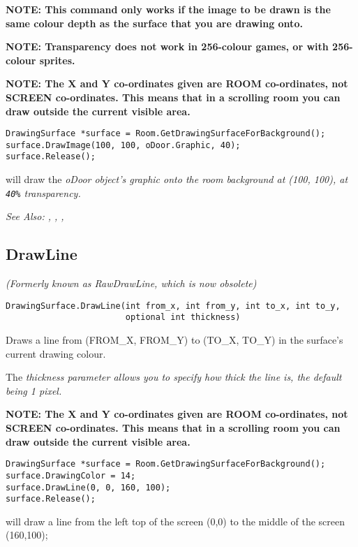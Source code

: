 \bf{NOTE:} This command only works if the image to be drawn is the same colour
depth as the surface that you are drawing onto.

\bf{NOTE:} Transparency does not work in 256-colour games, or with 256-colour sprites.

\bf{NOTE:} The X and Y co-ordinates given are ROOM co-ordinates, not SCREEN co-ordinates.
This means that in a scrolling room you can draw outside the current visible area.

\begin{verbatim}
DrawingSurface *surface = Room.GetDrawingSurfaceForBackground();
surface.DrawImage(100, 100, oDoor.Graphic, 40);
surface.Release();
\end{verbatim}
will draw the \it{oDoor} object's graphic onto the room background at (100, 100), at \verb$40%$
transparency.

\it{See Also:}
,
,
,


\subsection{DrawLine}\label{DrawingSurface.DrawLine}%

\it{(Formerly known as RawDrawLine, which is now obsolete)}

\begin{verbatim}
DrawingSurface.DrawLine(int from_x, int from_y, int to_x, int to_y,
                        optional int thickness)
\end{verbatim}
Draws a line from (FROM_X, FROM_Y) to (TO_X, TO_Y) in the surface's current drawing colour.

The \it{thickness} parameter allows you to specify how thick the line is, the default being 1 pixel.

\bf{NOTE:} The X and Y co-ordinates given are ROOM co-ordinates, not SCREEN co-ordinates.
This means that in a scrolling room you can draw outside the current visible area.

\begin{verbatim}
DrawingSurface *surface = Room.GetDrawingSurfaceForBackground();
surface.DrawingColor = 14;
surface.DrawLine(0, 0, 160, 100);
surface.Release();
\end{verbatim}
will draw a line from the left top of the screen (0,0) to the middle of the screen (160,100);

